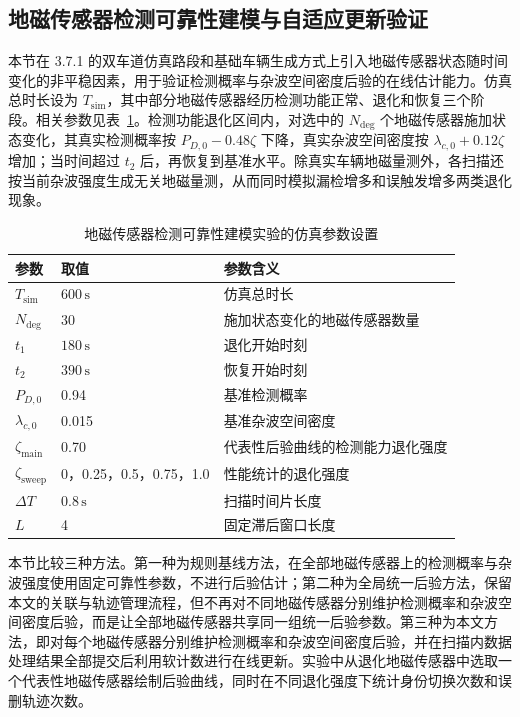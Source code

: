 \documentclass{xdupgthesis}
\begin{document}
\subsection{地磁传感器检测可靠性建模与自适应更新验证}

本节在 3.7.1 的双车道仿真路段和基础车辆生成方式上引入地磁传感器状态随时间变化的非平稳因素，用于验证检测概率与杂波空间密度后验的在线估计能力。仿真总时长设为 $T_{\mathrm{sim}}$，其中部分地磁传感器经历检测功能正常、退化和恢复三个阶段。相关参数见表~\ref{tab:ch3_node_adapt_sim}。检测功能退化区间内，对选中的 $N_{\mathrm{deg}}$ 个地磁传感器施加状态变化，其真实检测概率按 $P_{D,0}-0.48\zeta$ 下降，真实杂波空间密度按 $\lambda_{c,0}+0.12\zeta$ 增加；当时间超过 $t_2$ 后，再恢复到基准水平。除真实车辆地磁量测外，各扫描还按当前杂波强度生成无关地磁量测，从而同时模拟漏检增多和误触发增多两类退化现象。

\begin{table}[htbp]
	\centering
	\caption{地磁传感器检测可靠性建模实验的仿真参数设置}
	\label{tab:ch3_node_adapt_sim}
	\small
	\begin{tabular}{p{2.8cm}p{3.0cm}p{6.0cm}}
		\toprule
		参数 & 取值 & 参数含义 \\
		\midrule
		$T_{\mathrm{sim}}$ & $600\,\mathrm{s}$ & 仿真总时长 \\
		$N_{\mathrm{deg}}$ & 30 & 施加状态变化的地磁传感器数量 \\
		$t_1$ & $180\,\mathrm{s}$ & 退化开始时刻 \\
		$t_2$ & $390\,\mathrm{s}$ & 恢复开始时刻 \\
		$P_{D,0}$ & 0.94 & 基准检测概率 \\
		$\lambda_{c,0}$ & 0.015 & 基准杂波空间密度 \\
		$\zeta_{\mathrm{main}}$ & 0.70 & 代表性后验曲线的检测能力退化强度 \\
		$\zeta_{\mathrm{sweep}}$ & 0，0.25，0.5，0.75，1.0 & 性能统计的退化强度 \\
		$\Delta T$ & $0.8\,\mathrm{s}$ & 扫描时间片长度 \\
		$L$ & 4 & 固定滞后窗口长度 \\
		\bottomrule
	\end{tabular}
\end{table}

本节比较三种方法。第一种为规则基线方法，在全部地磁传感器上的检测概率与杂波强度使用固定可靠性参数，不进行后验估计；第二种为全局统一后验方法，保留本文的关联与轨迹管理流程，但不再对不同地磁传感器分别维护检测概率和杂波空间密度后验，而是让全部地磁传感器共享同一组统一后验参数。第三种为本文方法，即对每个地磁传感器分别维护检测概率和杂波空间密度后验，并在扫描内数据处理结果全部提交后利用软计数进行在线更新。实验中从退化地磁传感器中选取一个代表性地磁传感器绘制后验曲线，同时在不同退化强度下统计身份切换次数和误删轨迹次数。
\end{document}
